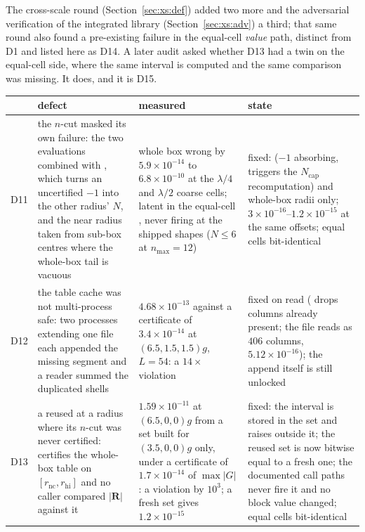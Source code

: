 \noindent
The cross-scale round (Section~\ref{sec:xs:def}) added two more and the adversarial
verification of the integrated library (Section~\ref{sec:xs:adv}) a third; that same round
also found a pre-existing  failure in the equal-cell \emph{value} path,
distinct from D1 and listed here as D14. A later audit asked whether D13 had a twin on the
equal-cell side, where the same interval is computed and the same comparison was missing.
It does, and it is D15.

\begin{center}\footnotesize
\begin{tabular}{@{}cL{0.24\textwidth}L{0.36\textwidth}L{0.24\textwidth}@{}}
\toprule
& defect & measured & state\\
\midrule
D11 & the $n$-cut masked its own failure: the two  evaluations combined with
, which turns an uncertified $-1$ into the other radius' $N$, and the near
radius taken from sub-box centres where the whole-box tail is vacuous &
whole box wrong by $5.9\times10^{-14}$ to $6.8\times10^{-10}$ at the $\lambda/4$ and
$\lambda/2$ coarse cells; latent in the equal-cell , never firing at the
shipped shapes ($N \le 6$ at $n_{\max} = 12$) & fixed:  ($-1$ absorbing,
triggers the $N_{\mathrm{cap}}$ recomputation) and whole-box radii only;
$3\times10^{-16}$--$1.2\times10^{-15}$ at the same offsets; equal cells bit-identical\\
D12 & the table cache was not multi-process safe: two processes extending one file each
appended the missing segment and a reader summed the duplicated shells &
$4.68\times10^{-13}$ against a certificate of $3.4\times10^{-14}$ at $(6.5,1.5,1.5)g$,
$L = 54$: a $14\times$ violation & fixed on read ( drops columns already
present; the file reads as $406$ columns, $5.12\times10^{-16}$); the append itself is
still unlocked\\
D13 & a  reused at a radius where its $n$-cut was never certified:
 certifies the whole-box table on
$[r_{\mathrm{nc}}, r_{\mathrm{hi}}]$ and no caller compared $|\mathbf{R}|$ against it &
$1.59\times10^{-11}$ at $(6.5,0,0)g$ from a set built for $(3.5,0,0)g$ only, under a
certificate of $1.7\times10^{-14}$ of $\max|G|$: a violation by $10^{3}$; a fresh set gives
$1.2\times10^{-15}$ & fixed: the interval is stored in the set and  raises
outside it; the reused set is now bitwise equal to a fresh one; the documented call paths
never fire it and no block value changed; equal cells bit-identical\\

\end{tabular}
\end{center}
